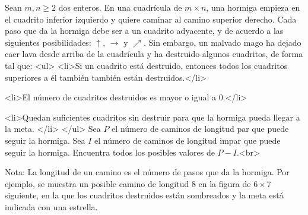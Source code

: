 Sean $m,n\geq 2$ dos enteros. En una cuadrícula de $m\times n$, una hormiga empieza en el cuadrito inferior izquierdo y quiere caminar al camino superior derecho. Cada paso que da la hormiga debe ser a un cuadrito adyacente, y de acuerdo a las siguientes posibilidades: $\uparrow$, $\rightarrow$ y $\nearrow$. Sin embargo, un malvado mago ha dejado caer lava desde arriba de la cuadrícula y ha destruido algunos cuadritos, de forma tal que:
<ul>
<li>Si un cuadrito está destruido, entonces todos los cuadritos superiores a él también también están destruidos.</li>

<li>El número de cuadritos destruidos es mayor o igual a $0$.</li>

<li>Quedan suficientes cuadritos sin destruir para que la hormiga pueda llegar a la meta. </li>
</ul>
Sea $P$ el número de caminos de longitud par que puede seguir la hormiga. Sea $I$ el número de caminos de longitud impar que puede seguir la hormiga. Encuentra todos los posibles valores de $P-I$.<br>

Nota: La longitud de un camino es el número de pasos que da la hormiga. Por ejemplo, se muestra un posible camino de longitud $8$ en la figura de $6\times 7$ siguiente, en la que los cuadritos destruidos están sombreados y la meta está indicada con una estrella.